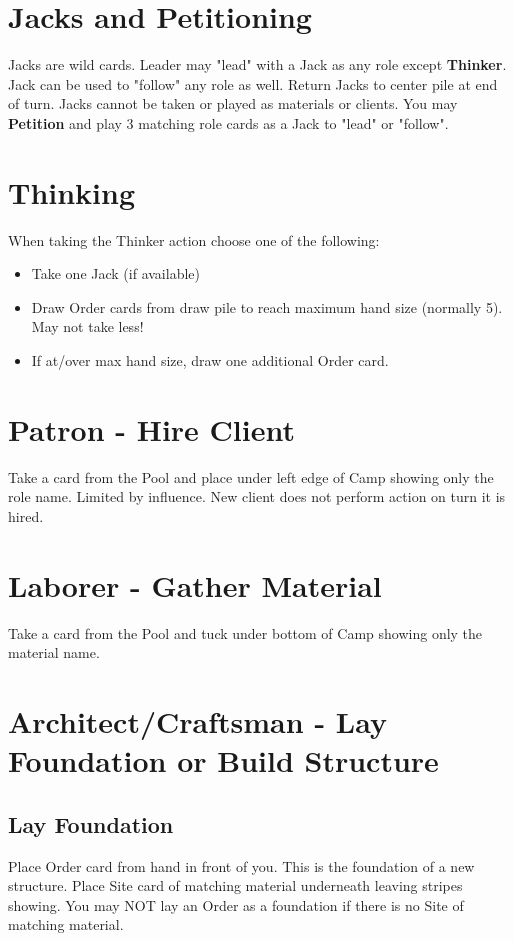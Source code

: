 \documentclass[12pt]{article}
\newenvironment{itemizeCustom}
{\begin{itemize}
  \setlength{\itemsep}{1pt}
  \setlength{\parskip}{0pt}
  \setlength{\parsep}{0pt}}
{\end{itemize}}
\begin{document}
\begin{multicols*}{2}
\section*{Jacks and Petitioning}
Jacks are wild cards. Leader may "lead" with a Jack as any role except \textbf{Thinker}. Jack can be used to "follow" any role as well. Return Jacks to center pile at end of turn. Jacks cannot be taken or played as materials or clients. You may \textbf{Petition} and play 3 matching role cards as a Jack to "lead" or "follow".

\section*{Thinking}
When taking the Thinker action choose one of the following:
\begin{itemizeCustom}
    \item Take one Jack (if available)
    \item Draw Order cards from draw pile to reach maximum hand size (normally 5). May not take less!
    \item If at/over max hand size, draw one additional Order card.
\end{itemizeCustom}

\section*{Patron - Hire Client}
Take a card from the Pool and place under left edge of Camp showing only the role name. Limited by influence. New client does not perform action on turn it is hired.

\section*{Laborer - Gather Material}
Take a card from the Pool and tuck under bottom of Camp showing only the material name.

\section*{Architect/Craftsman - Lay Foundation or Build Structure}
\subsection*{Lay Foundation}
Place Order card from hand in front of you. This is the foundation of a new structure. Place Site card of matching material underneath leaving stripes showing. You may NOT lay an Order as a foundation if there is no Site of matching material.


\end{multicols*}
\end{document}
